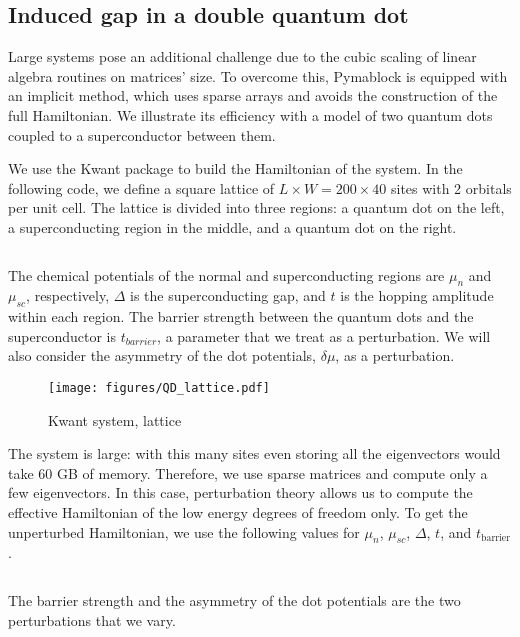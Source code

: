 \subsection{Induced gap in a double quantum dot}

Large systems pose an additional challenge due to the cubic scaling of linear
algebra routines on matrices' size.
To overcome this, Pymablock is equipped with an implicit method, which uses
sparse arrays and avoids the construction of the full Hamiltonian.
We illustrate its efficiency with a model of two quantum dots coupled to a
superconductor between them.

We use the Kwant package \cite{Groth_2014} to build the Hamiltonian of the
system.
In the following code, we define a square lattice of $L \times W = 200 \times
40$ sites with 2 orbitals per unit cell.
The lattice is divided into three regions: a quantum dot on the left, a
superconducting region in the middle, and a quantum dot on the right.
%
\inputminted[firstline=15, lastline=48]{ipython}{code_figures/lattice_system.py}
%
The chemical potentials of the normal and superconducting regions are $\mu_n$
and $\mu_{sc}$, respectively, $\Delta$ is the superconducting gap, and $t$
is the hopping amplitude within each region.
The barrier strength between the quantum dots and the superconductor is
$t_{barrier}$, a parameter that we treat as a perturbation.
We will also consider the asymmetry of the dot potentials, $\delta \mu$, as a
perturbation.
%
\begin{figure}
\centering
\texttt{[image: figures/QD\_lattice.pdf]}
\caption{Kwant system, lattice}
\label{fig:QD_lattice}
\end{figure}

The system is large: with this many sites even storing all the eigenvectors
would take 60 GB of memory.
Therefore, we use sparse matrices and compute only a few eigenvectors.
In this case, perturbation theory allows us to compute the effective
Hamiltonian of the low energy degrees of freedom only.
To get the unperturbed Hamiltonian, we use the following values for $\mu_n$,
$\mu_{sc}$, $\Delta$, $t$, and $t_{\text{barrier}}$.
%
\inputminted[firstline=106, lastline=107]{ipython}{code_figures/lattice_system.py}
%
The barrier strength and the asymmetry of the dot potentials are the two
perturbations that we vary.
%
\inputminted[firstline=109, lastline=114]{ipython}{code_figures/lattice_system.py}

